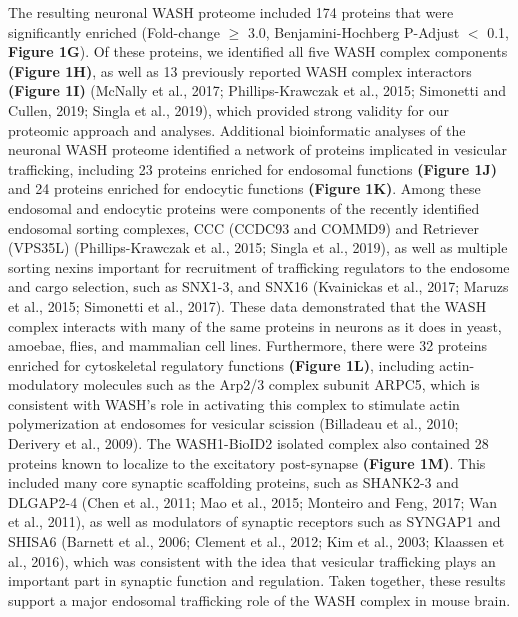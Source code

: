 

The resulting neuronal WASH proteome included 174 proteins that were
significantly enriched (Fold-change $\geq$ 3.0, Benjamini-Hochberg P-Adjust $<$ 0.1,
\textbf{Figure 1G}). Of these proteins, we identified all five WASH complex components
\textbf{(Figure 1H)}, as well as 13 previously reported WASH complex interactors 
\textbf{(Figure 1I)} (McNally et al., 2017; Phillips-Krawczak et al., 2015; Simonetti and
Cullen, 2019; Singla et al., 2019), which provided strong validity for our
proteomic approach and analyses. Additional bioinformatic analyses of the
neuronal WASH proteome identified a network of proteins implicated in vesicular
trafficking, including 23 proteins enriched for endosomal functions \textbf{(Figure 1J)}
and 24 proteins enriched for endocytic functions \textbf{(Figure 1K)}. Among these
endosomal and endocytic proteins were components of the recently identified
endosomal sorting complexes, CCC (CCDC93 and COMMD9) and Retriever (VPS35L)
(Phillips-Krawczak et al., 2015; Singla et al., 2019), as well as multiple
sorting nexins important for recruitment of trafficking regulators to the
endosome and cargo selection, such as SNX1-3, and SNX16 (Kvainickas et al.,
2017; Maruzs et al., 2015; Simonetti et al., 2017). These data demonstrated that
the WASH complex interacts with many of the same proteins in neurons as it does
in yeast, amoebae, flies, and mammalian cell lines. Furthermore, there were 32
proteins enriched for cytoskeletal regulatory functions \textbf{(Figure 1L)}, including
actin-modulatory molecules such as the Arp2/3 complex subunit ARPC5, which is
consistent with WASH’s role in activating this complex to stimulate actin
polymerization at endosomes for vesicular scission (Billadeau et al., 2010;
Derivery et al., 2009). The WASH1-BioID2 isolated complex also contained 28
proteins known to localize to the excitatory post-synapse \textbf{(Figure 1M)}. This
included many core synaptic scaffolding proteins, such as SHANK2-3 and DLGAP2-4
(Chen et al., 2011; Mao et al., 2015; Monteiro and Feng, 2017; Wan et al.,
2011), as well as modulators of synaptic receptors such as SYNGAP1 and SHISA6
(Barnett et al., 2006; Clement et al., 2012; Kim et al., 2003; Klaassen et al.,
2016), which was consistent with the idea that vesicular trafficking plays an
important part in synaptic function and regulation. Taken together, these
results support a major endosomal trafficking role of the WASH complex in mouse
brain. 

